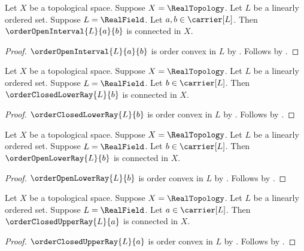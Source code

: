 \begin{corollary}\label{real_open_interval_is_connected}
    Let $X$ be a topological space.
    Suppose $X=\RealTopology$.
    Let $L$ be a linearly ordered set.
    Suppose $L=\RealField$.
    Let $a,b\in\carrier[L]$.
    Then $\orderOpenInterval{L}{a}{b}$ is connected in $X$.
\end{corollary}
\begin{proof}
    $\orderOpenInterval{L}{a}{b}$ is order convex in $L$ by
        .
    Follows by .
\end{proof}

\begin{corollary}\label{real_closed_lower_ray_is_connected}
    Let $X$ be a topological space.
    Suppose $X=\RealTopology$.
    Let $L$ be a linearly ordered set.
    Suppose $L=\RealField$.
    Let $b\in\carrier[L]$.
    Then $\orderClosedLowerRay{L}{b}$ is connected in $X$.
\end{corollary}
\begin{proof}
    $\orderClosedLowerRay{L}{b}$ is order convex in $L$ by
        .
    Follows by .
\end{proof}

\begin{corollary}\label{real_open_lower_ray_is_connected}
    Let $X$ be a topological space.
    Suppose $X=\RealTopology$.
    Let $L$ be a linearly ordered set.
    Suppose $L=\RealField$.
    Let $b\in\carrier[L]$.
    Then $\orderOpenLowerRay{L}{b}$ is connected in $X$.
\end{corollary}
\begin{proof}
    $\orderOpenLowerRay{L}{b}$ is order convex in $L$ by
        .
    Follows by .
\end{proof}

\begin{corollary}\label{real_closed_upper_ray_is_connected}
    Let $X$ be a topological space.
    Suppose $X=\RealTopology$.
    Let $L$ be a linearly ordered set.
    Suppose $L=\RealField$.
    Let $a\in\carrier[L]$.
    Then $\orderClosedUpperRay{L}{a}$ is connected in $X$.
\end{corollary}
\begin{proof}
    $\orderClosedUpperRay{L}{a}$ is order convex in $L$ by
        .
    Follows by .
\end{proof}

